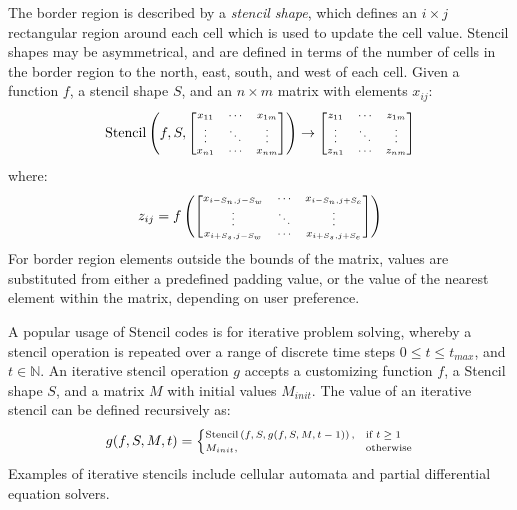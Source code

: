 \documentclass[nonatbib,preprint,nocopyrightspace,9pt]{sigplanconf}
\begin{document}
  The border region is described by a \emph{stencil shape}, which defines an $i
  \times j$ rectangular region around each cell which is used to update the cell
  value. Stencil shapes may be asymmetrical, and are defined in terms of the
  number of cells in the border region to the north, east, south, and west of each
  cell. Given a function $f$, a stencil shape $S$, and an $n \times m$ matrix with
  elements $x_{ij}$:
  \begin{equation}
    \scriptsize
    \stencil \left( f, S,
    \begin{bmatrix}
      x_{11} & \cdots & x_{1m} \\
      \vdots & \ddots & \vdots \\
      x_{n1} & \cdots & x_{nm}
    \end{bmatrix} \right)
    \to
    \begin{bmatrix}
      z_{11} & \cdots & z_{1m} \\
      \vdots & \ddots & \vdots \\
      z_{n1} & \cdots & z_{nm}
    \end{bmatrix}
  \end{equation}
  where:
  \begin{equation}
    \scriptsize
    z_{ij} = f \left(
    \begin{bmatrix}
      x_{i-S_n,j-S_w} & \cdots & x_{i-S_n,j+S_e} \\
      \vdots & \ddots & \vdots \\
      x_{i+S_s,j-S_w} & \cdots & x_{i+S_s,j+S_e}
    \end{bmatrix} \right)
  \end{equation}
  For border region elements outside the bounds of the matrix, values are
  substituted from either a predefined padding value, or the value of the nearest
  element within the matrix, depending on user preference.

  A popular usage of Stencil codes is for iterative problem solving, whereby a
  stencil operation is repeated over a range of discrete time steps $0 \le t \le
  t_{max}$, and $t \in \mathbb{N}$. An iterative stencil operation $g$ accepts a
  customizing function $f$, a Stencil shape $S$, and a matrix $M$ with initial
  values $M_{init}$. The value of an iterative stencil can be defined recursively
  as:
  \begin{equation}
    \scriptsize
    g(f, S, M, t) =
    \begin{cases}
      \stencil \left( f, S, g(f, S, M, t-1) \right),& \text{if } t \geq 1\\
      M_{init}, & \text{otherwise}
    \end{cases}
  \end{equation}
  Examples of iterative stencils include cellular automata and partial
  differential equation solvers.
\end{document}
